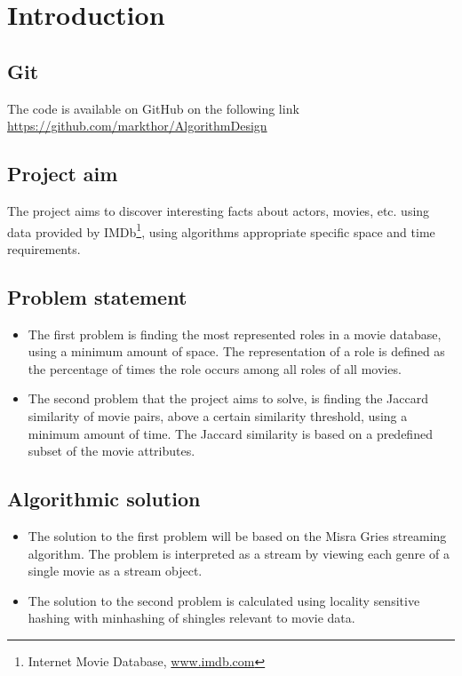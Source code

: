 \section{Introduction}

\subsection{Git}
The code is available on GitHub on the following link \url{https://github.com/markthor/AlgorithmDesign}

\subsection{Project aim}
The project aims to discover interesting facts about actors, movies, etc. using data provided by IMDb\footnote{Internet Movie Database, \url{www.imdb.com}}, using algorithms appropriate specific space and time requirements.

\subsection{Problem statement}
\begin{itemize}
	\item The first problem is finding the most represented roles in a movie database, using a minimum amount of space. The representation of a role is defined as the percentage of times the role occurs among all roles of all movies.
	\item The second problem that the project aims to solve, is finding the Jaccard similarity of movie pairs, above a certain similarity threshold, using a minimum amount of time. The Jaccard similarity is based on a predefined subset of the movie attributes.
\end{itemize}

\subsection{Algorithmic solution}
\begin{itemize}
	\item The solution to the first problem will be based on the Misra Gries streaming algorithm. The problem is interpreted as a stream by viewing each genre of a single movie as a stream object.
	\item The solution to the second problem is calculated using locality sensitive hashing with minhashing of shingles relevant to movie data.
\end{itemize}

